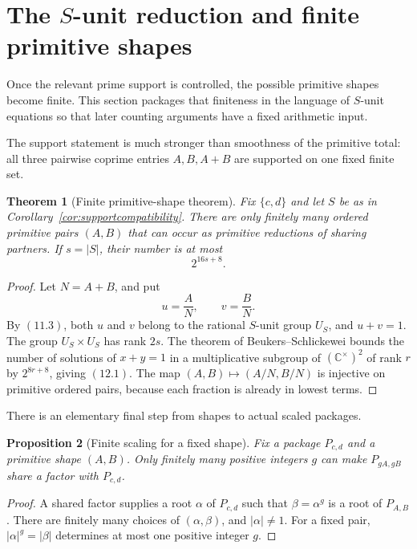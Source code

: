 \documentclass[11pt]{article}
\newtheorem{theorem}{Theorem}[section]
\newtheorem{proposition}[theorem]{Proposition}
\theoremstyle{definition}
\newcommand{\C}{\mathbb C}
\begin{document}
\section{The \texorpdfstring{\(S\)}{S}-unit reduction and finite primitive shapes}

Once the relevant prime support is controlled, the possible primitive shapes become finite.  This section packages that finiteness in the language of \(S\)-unit equations so that later counting arguments have a fixed arithmetic input.
\label{sec:sunit}

The support statement is much stronger than smoothness of the primitive total:
all three pairwise coprime entries \(A,B,A+B\) are supported on one fixed
finite set.

\begin{theorem}[Finite primitive-shape theorem]
\label{thm:finiteshapes}
Fix \(\{c,d\}\) and let \(S\) be as in
Corollary~\ref{cor:supportcompatibility}.  There are only finitely many
ordered primitive pairs \((A,B)\) that can occur as primitive reductions of
sharing partners.  If \(s=|S|\), their number is at most
\begin{equation}
 2^{16s+8}.
 \tag{12.1}
\end{equation}
\end{theorem}

\begin{proof}
Let \(N=A+B\), and put
\[
 u=\frac{A}{N},\qquad v=\frac{B}{N}.
\]
By \((11.3)\), both \(u\) and \(v\) belong to the rational \(S\)-unit
group \(U_S\), and \(u+v=1\).  The group
\(U_S\times U_S\) has rank \(2s\).  The theorem of
Beukers--Schlickewei \cite{BeukersSchlickewei1996} bounds the number of
solutions of \(x+y=1\) in a multiplicative subgroup of
\((\C^\times)^2\) of rank \(r\) by \(2^{8r+8}\), giving \((12.1)\).
The map \((A,B)\mapsto(A/N,B/N)\) is injective on primitive ordered pairs,
because each fraction is already in lowest terms.
\end{proof}

There is an elementary final step from shapes to actual scaled packages.

\begin{proposition}[Finite scaling for a fixed shape]
\label{prop:finitescaling}
Fix a package \(P_{c,d}\) and a primitive shape \((A,B)\).  Only finitely
many positive integers \(g\) can make \(P_{gA,gB}\) share a factor with
\(P_{c,d}\).
\end{proposition}

\begin{proof}
A shared factor supplies a root \(\alpha\) of \(P_{c,d}\) such that
\(\beta=\alpha^g\) is a root of \(P_{A,B}\).  There are finitely many
choices of \((\alpha,\beta)\), and \(|\alpha|\neq1\).  For a fixed pair,
\(|\alpha|^g=|\beta|\) determines at most one positive integer \(g\).
\end{proof}
\end{document}
